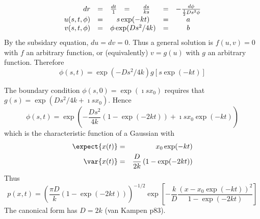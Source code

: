 \documentclass{beamer}
\begin{document}
\begin{frame}{}
\[
\begin{array}{rccccccl}
dr & = & \frac{dt}{1} & = & \frac{ds}{ks} & = & -\frac{d\phi}{\frac{1}{2} Ds^2 \phi} \\
u(s,t,\phi) & = & \multicolumn{3}{c}{s\exp(-kt)} & = & a \\
v(s,t,\phi) & = & \multicolumn{3}{c}{\phi\exp(Ds^2/4k)} & = & b
\end{array}
\]
By the subsidary equation, $du=dv=0$.
Thus a general solution %
is $f(u,v)=0$ with $f$ an arbitrary function,
or (equivalently) $v=g(u)$ with $g$ an arbitrary function.
Therefore
\[
\phi(s,t) = \exp(-Ds^2/4k) g\left[ s \exp(-kt) \right]
\]
\end{frame}
\begin{frame}{}
The boundary condition $\phi(s,0)=\exp(\imath sx_0)$ requires that $g(s) = \exp(Ds^2/4k + \imath sx_0)$.
Hence
\[
\phi(s,t) = \exp \left( -\frac{Ds^2}{4k} (1 - \exp(-2kt))  + \imath sx_0 \exp(-kt) \right)
\]
which is the characteristic function of a Gaussian with
\begin{eqnarray*}
\expect{x(t)} & = & x_0 \exp(-kt) \\
\var{x(t)} & = & \frac{D}{2k} \left( 1 - \exp(-2kt) \right)
\end{eqnarray*}
Thus
\[
p(x,t) = \left( \frac{\pi D}{k}(1-\exp(-2kt)) \right)^{-1/2} \exp \left[ -\frac{k}{D} \frac{(x - x_0 \exp(-kt))^2}{1-\exp(-2kt)} \right]
\]
The canonical form has $D=2k$ (van Kampen p83).
\end{frame}
%   
%   
%   
%  
\end{document}
